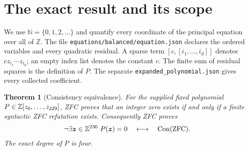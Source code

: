 \documentclass[11pt]{article}
\newtheorem{theorem}{Theorem}[section]
\theoremstyle{remark}\newtheorem{remark}[theorem]{Remark}
\newcommand{\Z}{\mathbb Z}\newcommand{\N}{\mathbb N}
\newcommand{\Con}{\operatorname{Con}}
\newcommand{\lcm}{\operatorname{lcm}}
\begin{document}
\begin{abstract}
We simplify the direct proof-certificate route to a Diophantine equation
for syntactic consistency of ZFC. The central change is to give one
binomial coefficient two jobs. With a proof horizon $t$, set
$R=16^t$ and $B=\binom{R+t}{t}$. The number $B$ supplies both the
prime-power selectors for proof rows and the evaluation point in the
label weights $1+jB$. An elementary bound for $\lcm(1,\ldots,t)$
proves the required row coverage, while $B>(t+1)^t$ proves exact
label-multiplicity recovery. No certificate of factorial authenticity,
and no separate variable-base growth power, is needed.

We then compose this arithmetic front with the predecessor's modular
numerator method in the current signed Pell architecture. The new
compatibility argument allows all nine CRT representatives to remain
signed, recovers the necessary positive quantities from existing power
requests, and moves eleven numerator outputs out of the magnitude frame.
A new cofinal two-square completion of the Pell center restores the
common modular-root congruence. Only six exponential requests remain exact; successor
denominators use multiplication. The resulting finite quadratic system
is contracted with explicit integral restoration maps and converted to
the literal quartic displayed in this report. The contribution is a
structural improvement within the direct, small-coefficient family;
few-variable constructions with different coefficient and degree costs
remain distinct alternatives.
\end{abstract}
\tableofcontents
\newpage

\section{The exact result and its scope}

We use $\N=\{0,1,2,\ldots\}$ and quantify every coordinate of the
principal equation over all of $\Z$. The file
\nolinkurl{equations/balanced/equation.json} declares the ordered variables
and every quadratic residual. A sparse term $[c,[i_1,\ldots,i_d]]$ denotes
$c z_{i_1}\cdots z_{i_d}$; an empty index list denotes the constant $c$.
The finite sum of residual squares is the definition of $P$. The separate
\nolinkurl{expanded_polynomial.json} gives every collected coefficient.

\begin{theorem}[Consistency equivalence]\label{thm:main}
For the supplied fixed polynomial $P\in\Z[z_0,\ldots,z_{\MainLastVar}]$,
ZFC proves that an integer zero exists if and only if a finite syntactic
ZFC refutation exists. Consequently ZFC proves
\[
 \neg\exists\boldsymbol z\in\Z^{\MainVars}\ P(\boldsymbol z)=0
 \quad\longleftrightarrow\quad\Con(\mathrm{ZFC}).
\]
The exact degree of $P$ is four.
\end{theorem}
\end{document}
